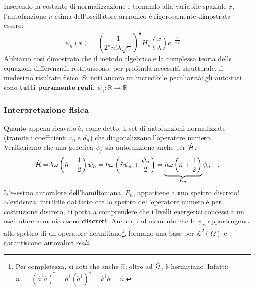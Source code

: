 Inserendo la costante di normalizzazione e tornando alla variabile spaziale $x$, l'autofunzione $n$-esima dell'oscillatore armonico è rigorosamente dimostrata essere:
\begin{equation}
    \psi_n(x) = \left( \frac{1}{2^n n! \lambda \sqrt{\pi}} \right)^{\frac{1}{2}} H_n\left(\frac{x}{\lambda}\right) e^{-\frac{x^2}{2\lambda^2}} \quad.
\end{equation}
Abbiamo così dimostrato che il metodo algebrico e la complessa teoria delle equazioni differenziali restituiscono, per profonda necessità strutturale, il medesimo risultato fisico. Si noti ancora un'incredibile peculiarità: gli autostati sono \textbf{tutti puramente reali}, $\psi_n: \mathbb{R} \to \mathbb{R}$!

\subsubsection{Interpretazione fisica}
Quanto appena ricavato è, come detto, il set di autofunzioni normalizzate (tramite i coefficienti $c_n$ e $d_n$) che diagonalizzano l'operatore numero. Verifichiamo che una generica $\psi_n$ sia autofunzione anche per $\hat{\mathcal{H}}$:
\[
    \hat{\mathcal{H}} = \hbar \omega \left(\hat{n} + \frac{1}{2}\right) \psi_n = \hbar \omega \left(\hat{n}\psi_n + \frac{\psi_n}{2}\right) = \underbrace{\hbar \omega \left({n} + \frac{1}{2}\right)}_{E_n} \psi_n \quad.
\]
L'$n$-esimo autovalore dell'hamiltoniana, $E_n$, appartiene a uno spettro discreto! L'evidenza, intuibile dal fatto che lo spettro dell'operatore numero è per costruzione discreto, ci porta a comprendere che i livelli energetici concessi a un oscillatore armonico sono \textbf{discreti}. Ancora, dal momento che le $\psi_n$ appartengono allo spettro di un operatore hermitiano\footnote{Per completezza, si noti che anche $\hat{n}$, oltre ad $\hat{\mathcal{H}}$, è hermitiano. Infatti: $\hat{n}^\dagger = (\hat{a}^\dagger\hat{a})^\dagger = \hat{a}^\dagger (\hat{a}^\dagger)^\dagger = \hat{a}^\dagger \hat{a} = \hat{n}$.}, formano una base per $\mathcal{L}^2(\Omega)$ e garantiscono autovalori \textit{reali}. 

